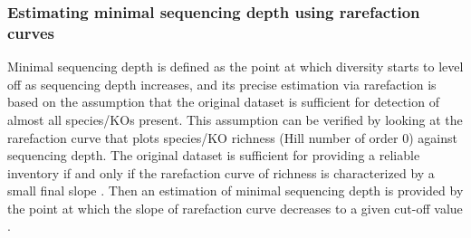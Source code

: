 \documentclass[11pt]{article}
\begin{document}
      \subsubsection{Estimating minimal sequencing depth using rarefaction curves} 
      Minimal sequencing depth is defined as the point at which diversity starts to level off as sequencing depth increases, and its precise estimation via rarefaction is based on the assumption that the original dataset is sufficient for detection of almost all species/KOs present. 
      This assumption can be verified by looking at the rarefaction curve that plots species/KO richness (Hill number of order 0) against sequencing depth. 
      The original dataset is sufficient for providing a reliable inventory if and only if the rarefaction curve of richness is characterized by a small final slope \citep{heck1975explicit,moreno2000assessing,hortal2004butterfly,hortal2005ed,gomez2014using}. 
      Then an estimation of minimal sequencing depth is provided by the point at which the slope of rarefaction curve decreases to a given cut-off value \citep{hortal2005ed}. 
    
\end{document}
